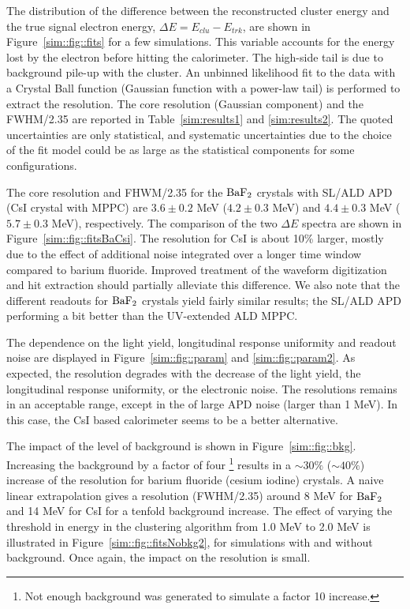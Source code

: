 The distribution of the difference between the reconstructed cluster energy and the true signal electron energy, $\Delta E = E_{clu}-E_{trk}$, 
are shown in Figure~\ref{sim::fig::fits} for a few simulations. This variable accounts for the energy lost by the electron before hitting 
the calorimeter. The high-side tail is due to background pile-up with the cluster. An unbinned likelihood fit to the data with a Crystal 
Ball function (Gaussian function with a power-law tail) is performed to extract the resolution. The core resolution (Gaussian component) 
and the FWHM/2.35 are reported in Table~\ref{sim:results1} and \ref{sim:results2}. The quoted uncertainties are only statistical, and 
systematic uncertainties due to the choice of the fit model could be as large as the statistical components for some configurations. 

The core resolution and FHWM/2.35 for the $\rm BaF_2$ crystals with SL/ALD APD (CsI crystal with MPPC) are $3.6 \pm 0.2$ MeV ($ 4.2 \pm 0.3$ MeV) 
and $4.4\pm 0.3$ MeV ($5.7 \pm 0.3$ MeV), respectively. The comparison of the two $\Delta E$ spectra are shown in Figure~\ref{sim::fig::fitsBaCsi}. 
The resolution for CsI is about 10\% larger, mostly due to the effect of additional noise integrated over a longer time window compared to 
barium fluoride. Improved treatment of the waveform digitization and hit extraction should partially alleviate this difference. We also note 
that the different readouts for $\rm BaF_2$ crystals yield fairly similar results; the SL/ALD APD performing a bit better than the 
UV-extended ALD MPPC.

The dependence on the light yield, longitudinal response uniformity and readout noise are displayed in Figure~\ref{sim::fig::param} and \ref{sim::fig::param2}. 
As expected, the resolution degrades with the decrease of the light yield, the longitudinal response uniformity, or the electronic noise. The resolutions 
remains in an acceptable range, except in the of large APD noise (larger than 1 MeV). In this case, the CsI based calorimeter seems to be a better alternative. 

The impact of the level of background is shown in Figure~\ref{sim::fig::bkg}. Increasing the background by a factor of four \footnote{Not enough background 
was generated to simulate a factor 10 increase.} results in a $\sim30\%$ ($\sim40\%$) increase of the resolution for barium fluoride (cesium iodine) crystals. 
A naive linear extrapolation gives a resolution (FWHM/2.35) around 8 MeV for $\rm BaF_2$ and 14 MeV for CsI for a tenfold background increase. The effect of 
varying the threshold in energy in the clustering algorithm from 1.0 MeV to 2.0 MeV is illustrated in Figure~\ref{sim::fig::fitsNobkg2}, for simulations 
with and without background. Once again, the impact on the resolution is small.

